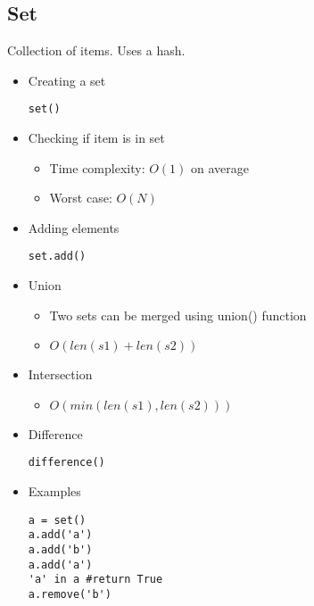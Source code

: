\documentclass[a4paper, 11.25pt]{article}
\begin{document}
\subsection{Set}
Collection of items. Uses a hash.
\begin{itemize}
    \item Creating a set
    \begin{lstlisting}[style=PythonStyle]
set()\end{lstlisting}     
    \item Checking if item is in set
    \begin{itemize}
        \item Time complexity: $O(1)$ on average
        \item Worst case: $O(N)$
    \end{itemize}
    \item Adding elements
    \begin{lstlisting}[style=PythonStyle]
set.add()\end{lstlisting}     
    \item Union
    \begin{itemize}
        \item Two sets can be merged using union() function
        \item $O(len(s1) + len(s2))$
    \end{itemize}
    \item Intersection
    \begin{itemize}
        \item $O(min(len(s1), len(s2)))$
    \end{itemize}
    \item Difference
    \begin{lstlisting}[style=PythonStyle]
difference()\end{lstlisting}
    \item Examples
    \begin{lstlisting}[style=PythonStyle]
a = set()
a.add('a')
a.add('b')
a.add('a')
'a' in a #return True
a.remove('b')\end{lstlisting}    
\end{itemize}
\end{document}
